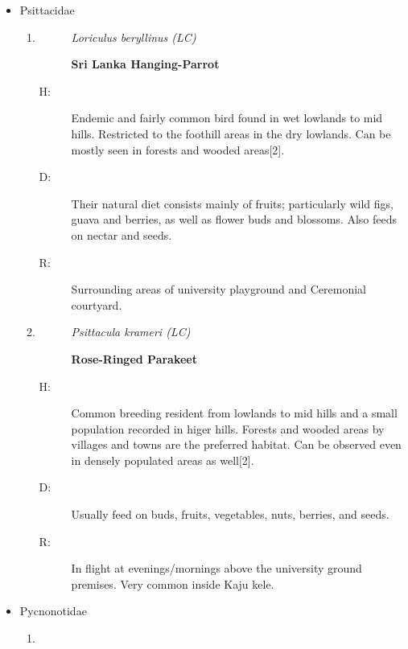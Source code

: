 \begin{itemize}
\begin{enumerate}
\begin{description}
\end{description}%
\end{enumerate}%
\item%
Psittacidae%
\begin{enumerate}%
\item%
\begin{description}%
\item[]%
\textit{Loriculus beryllinus (LC)}%
\item[]%
\textbf{Sri Lanka Hanging{-}Parrot}%
\end{description}%
\begin{description}%
\item[H: ]%
Endemic and fairly common bird found in wet lowlands to mid hills. Restricted to the foothill areas in the dry lowlands. Can be mostly seen in forests and wooded areas{[}2{]}.%
\item[D: ]%
Their natural diet consists mainly of fruits; particularly wild figs, guava and berries, as well as flower buds and blossoms. Also feeds on nectar and seeds.%
\item[R: ]%
Surrounding areas of university playground and Ceremonial courtyard.%
\end{description}%
\item%
\begin{description}%
\item[]%
\textit{Psittacula krameri (LC)}%
\item[]%
\textbf{Rose{-}Ringed Parakeet}%
\end{description}%
\begin{description}%
\item[H: ]%
Common breeding resident from lowlands to mid hills and a small population recorded in higer hills. Forests and wooded areas by villages and towns are the preferred habitat. Can be observed even in densely populated areas as well{[}2{]}.%
\item[D: ]%
Usually feed on buds, fruits, vegetables, nuts, berries, and seeds.%
\item[R: ]%
In flight at evenings/mornings above the university ground premises. Very common inside Kaju kele.%
\end{description}%
\end{enumerate}%
\item%
Pycnonotidae%
\begin{enumerate}%
\item%
\begin{description}%
\item[]%

\end{description}
\end{enumerate}
\end{itemize}
